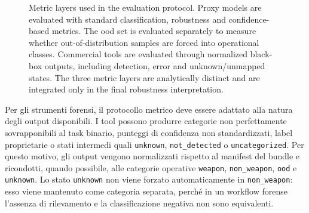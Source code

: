 \begin{figure}[H]
{%
}
\caption[Metric layers used in the evaluation protocol]{Metric layers used in
the evaluation protocol. Proxy models are evaluated with standard
classification, robustness and confidence-based metrics. The \gls{ood} set is
evaluated separately to measure whether out-of-distribution samples are forced
into operational classes. Commercial tools are evaluated through normalized
black-box outputs, including detection, error and unknown/unmapped states. The
three metric layers are analytically distinct and are integrated only in the
final robustness interpretation.}
\label{fig:methodology-metric-layers}
\end{figure}


Per gli strumenti forensi, il protocollo metrico deve essere
adattato alla natura degli output disponibili. I tool possono produrre categorie
non perfettamente sovrapponibili al task binario, punteggi di confidenza non
standardizzati, label proprietarie o stati intermedi quali \texttt{unknown},
\texttt{not\_detected} o \texttt{uncategorized}. Per questo motivo, gli output
vengono normalizzati rispetto al manifest del bundle e ricondotti, quando
possibile, alle categorie operative \texttt{weapon}, \texttt{non\_weapon},
\texttt{ood} e \texttt{unknown}. Lo stato \texttt{unknown} non viene forzato
automaticamente in \texttt{non\_weapon}: esso viene mantenuto come categoria
separata, perché in un workflow forense l'assenza di rilevamento e la
classificazione negativa non sono equivalenti.

